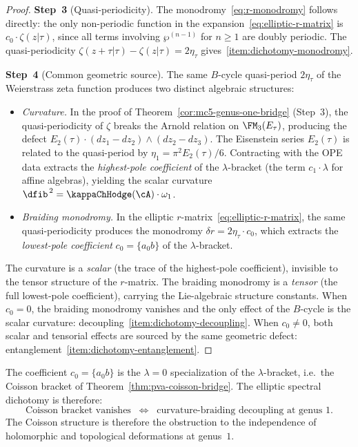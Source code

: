 \begin{proof}
\textbf{Step~3} (Quasi-periodicity).
The monodromy~\eqref{eq:r-monodromy} follows directly:
the only non-periodic function in the
expansion~\eqref{eq:elliptic-r-matrix} is
$c_0 \cdot \zeta(z|\tau)$, since all terms involving
$\wp^{(n-1)}$ for $n \ge 1$ are doubly periodic.
The quasi-periodicity
$\zeta(z + \tau|\tau) - \zeta(z|\tau) = 2\eta_\tau$
gives~\ref{item:dichotomy-monodromy}.

\textbf{Step~4} (Common geometric source).
The same $B$-cycle quasi-period $2\eta_\tau$ of the Weierstrass
zeta function produces two distinct algebraic structures:
\begin{itemize}
\item \emph{Curvature.}
In the proof of Theorem~\ref{cor:mc5-genus-one-bridge}
(Step~3), the quasi-periodicity of $\zeta$ breaks the Arnold
relation on $\FM_3(E_\tau)$, producing the defect
$E_2(\tau) \cdot (dz_1 - dz_2) \wedge (dz_2 - dz_3)$.
The Eisenstein series $E_2(\tau)$ is related to the
quasi-period by $\eta_1 = \pi^2 E_2(\tau) / 6$.
Contracting with the OPE data extracts the
\emph{highest-pole coefficient} of the $\lambda$-bracket
(the term $c_1 \cdot \lambda$ for affine algebras), yielding
the scalar curvature
$\dfib^{\,2} = \kappaChHodge(\cA) \cdot \omega_1$.

\item \emph{Braiding monodromy.}
In the elliptic $r$-matrix~\eqref{eq:elliptic-r-matrix},
the same quasi-periodicity produces the monodromy
$\delta r = 2\eta_\tau \cdot c_0$, which extracts the
\emph{lowest-pole coefficient} $c_0 = \{a {}_0 b\}$ of the
$\lambda$-bracket.
\end{itemize}
The curvature is a \emph{scalar} (the trace of the
highest-pole coefficient), invisible to the tensor structure
of the $r$-matrix.
The braiding monodromy is a \emph{tensor} (the full
lowest-pole coefficient), carrying the Lie-algebraic structure
constants. When $c_0 = 0$, the braiding monodromy vanishes
and the only effect of the $B$-cycle is the scalar curvature:
decoupling~\ref{item:dichotomy-decoupling}. When
$c_0 \ne 0$, both scalar and tensorial effects are sourced
by the same geometric defect:
entanglement~\ref{item:dichotomy-entanglement}.
\end{proof}

\begin{remark}
\label{rem:Coisson-discriminant}
The coefficient $c_0 = \{a {}_0 b\}$ is the $\lambda = 0$
specialization of the $\lambda$-bracket, i.e.\ the Coisson bracket
of Theorem~\ref{thm:pva-coisson-bridge}. The elliptic spectral
dichotomy is therefore:
\[
\text{Coisson bracket vanishes}
\;\;\Longleftrightarrow\;\;
\text{curvature-braiding decoupling at genus~$1$}.
\]
The Coisson structure is therefore the obstruction to the independence of holomorphic
and topological deformations at genus~$1$.
\end{remark}

